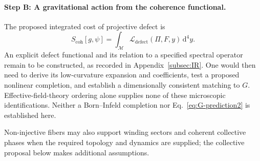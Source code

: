    \paragraph{Step B: A gravitational action from the coherence functional.}
      The proposed integrated cost of projective defect is
    \begin{equation}
      S_{\mathrm{coh}}[g,\psi]
      = \int_{\mathcal{M}} \mathcal{L}_{\mathrm{defect}}(\Pi,F,y)\,\mathrm{d}^4y.
      \label{eq:EH-result}
    \end{equation}
      An explicit defect functional and its relation to a specified spectral operator remain to be constructed,
      as recorded in Appendix~\ref{subsec:IR}.
      One would then need to derive its low-curvature expansion and coefficients, test a proposed nonlinear
      completion, and establish a dimensionally consistent matching to $G$.
      Effective-field-theory ordering alone supplies none of these microscopic identifications.
      Neither a Born--Infeld completion nor Eq.~\eqref{eq:G-prediction2} is established here.

      Non-injective fibers may also support winding sectors and coherent collective phases when the required
      topology and dynamics are supplied; the collective proposal below makes additional assumptions.
